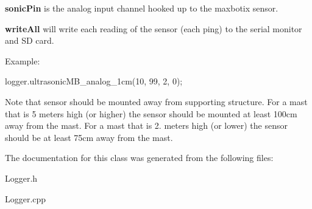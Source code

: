 {\bfseries sonic\+Pin} is the analog input channel hooked up to the maxbotix sensor.

{\bfseries write\+All} will write each reading of the sensor (each ping) to the serial monitor and SD card.

Example\+: 
\begin{DoxyCode}
logger.ultrasonicMB\_analog\_1cm(10, 99, 2, 0);
\end{DoxyCode}
 Note that sensor should be mounted away from supporting structure. For a mast that is 5 meters high (or higher) the sensor should be mounted at least 100cm away from the mast. For a mast that is 2. meters high (or lower) the sensor should be at least 75cm away from the mast.

The documentation for this class was generated from the following files\+:\begin{DoxyCompactItemize}
\item 
Logger.\+h\item 
Logger.\+cpp\end{DoxyCompactItemize}
